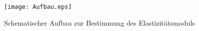 \documentclass[12pt,a4paper]{article}
\author{Jonah Blank, David Rolf}
\begin{document}
\begin{figure}
	\centering
	\texttt{[image: Aufbau.eps]}
	\caption{Schematischer Aufbau zur Bestimmung des Elastizitätsmoduls\cite{V103}}
	\label{fig:Aufbau}
\end{figure}
\end{document}
